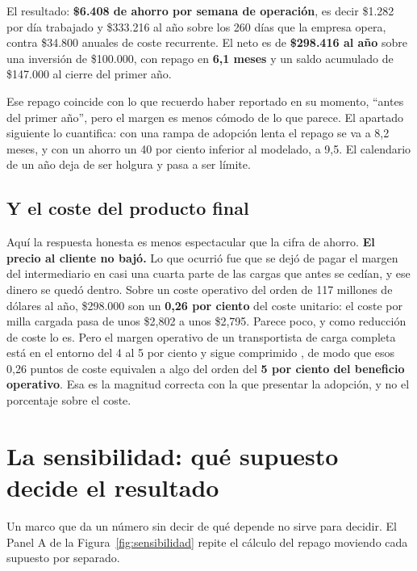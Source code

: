 \documentclass[11pt,letterpaper]{article}
\begin{document}
El resultado: \textbf{\$6.408 de ahorro por semana de operación}, es decir
\$1.282 por día trabajado y \$333.216 al año sobre los 260 días que la empresa
opera, contra \$34.800 anuales de coste recurrente. El neto es de
\textbf{\$298.416 al año} sobre una inversión de \$100.000, con repago en
\textbf{6,1 meses} y un saldo acumulado de \$147.000 al cierre del primer año.

Ese repago coincide con lo que recuerdo haber reportado en su momento,
\enquote{antes del primer año}, pero el margen es menos cómodo de lo que
parece. El apartado siguiente lo cuantifica: con una rampa de adopción lenta
el repago se va a 8,2 meses, y con un ahorro un 40 por ciento inferior al
modelado, a 9,5. El calendario de un año deja de ser holgura y pasa a ser
límite.

\subsection*{Y el coste del producto final}

Aquí la respuesta honesta es menos espectacular que la cifra de ahorro.
\textbf{El precio al cliente no bajó.} Lo que ocurrió fue que se dejó de pagar
el margen del intermediario en casi una cuarta parte de las cargas que antes
se cedían, y ese dinero se quedó dentro. Sobre un coste operativo del orden de
117 millones de dólares al año, \$298.000 son un \textbf{0,26 por ciento} del
coste unitario: el coste por milla cargada pasa de unos \$2,802 a unos
\$2,795. Parece poco, y como reducción de coste lo es. Pero el margen
operativo de un transportista de carga completa está en el entorno del 4 al 5
por ciento y sigue comprimido \parencite{atri2026}, de modo que esos 0,26
puntos de coste equivalen a algo del orden del \textbf{5 por ciento del
beneficio operativo}. Esa es la
magnitud correcta con la que presentar la adopción, y no el porcentaje sobre
el coste.

\section{La sensibilidad: qué supuesto decide el resultado}

Un marco que da un número sin decir de qué depende no sirve para decidir. El
Panel A de la Figura~\ref{fig:sensibilidad} repite el cálculo del repago
moviendo cada supuesto por separado.
\end{document}
